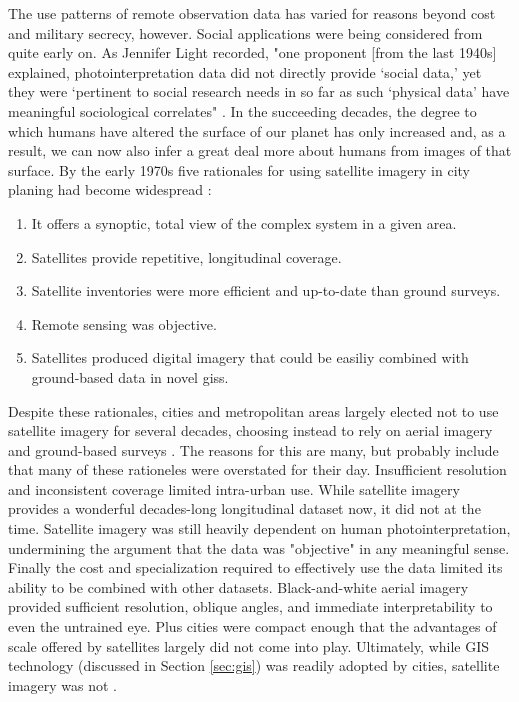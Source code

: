 The use patterns of remote observation data has varied for reasons beyond cost and military secrecy, however. Social applications were being considered from quite early on. As Jennifer Light recorded, "one proponent [from the last 1940s] explained, photointerpretation data did not directly provide `social data,' yet they were `pertinent to social research needs in so far as such `physical data' have meaningful sociological correlates" \cite{lightWarfareWelfareDefense2005}. In the succeeding decades, the degree to which humans have altered the surface of our planet has only increased and, as a result, we can now also infer a great deal more about humans from images of that surface. By the early 1970s five rationales for using satellite imagery in city planing had become widespread \cite{lightWarfareWelfareDefense2005}:

\begin{enumerate}[itemsep=0pt,parsep=0pt]
	\item{It offers a synoptic, total view of the complex system in a given area.}
	\item{Satellites provide repetitive, longitudinal coverage.}
	\item{Satellite inventories were more efficient and up-to-date than ground surveys.}
	\item{Remote sensing was objective.}
	\item{Satellites produced digital imagery that could be easiliy combined with ground-based data in novel \acp{gis}.}
\end{enumerate}

Despite these rationales, cities and metropolitan areas largely elected not to use satellite imagery for several decades, choosing instead to rely on aerial imagery and ground-based surveys \cite{lightWarfareWelfareDefense2005}. The reasons for this are many, but probably include that many of these rationeles were overstated for their day. Insufficient resolution and inconsistent coverage limited intra-urban use. While satellite imagery provides a wonderful decades-long longitudinal dataset now, it did not at the time. Satellite imagery was still heavily dependent on human photointerpretation, undermining the argument that the data was "objective" in any meaningful sense. Finally the cost and specialization required to effectively use the data limited its ability to be combined with other datasets. Black-and-white aerial imagery provided sufficient resolution, oblique angles, and immediate interpretability to even the untrained eye. Plus cities were compact enough that the advantages of scale offered by satellites largely did not come into play. Ultimately, while GIS technology (discussed in Section \ref{sec:gis}) was readily adopted by cities, satellite imagery was not \cite{lightWarfareWelfareDefense2005}.

